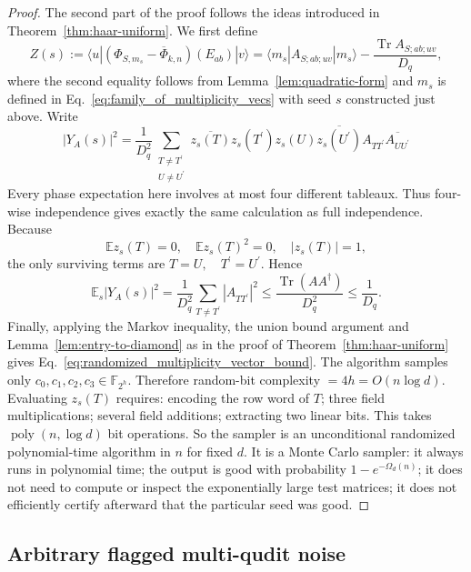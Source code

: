 \documentclass[11pt,letterpaper]{article}
\newcounter{alg}
\theoremstyle{plain}
\theoremstyle{plain}
\theoremstyle{plain}
\theoremstyle{plain}
\theoremstyle{plain}
\theoremstyle{plain}
\theoremstyle{plain}
\theoremstyle{definition}
\theoremstyle{plain}
\begin{document}
\begin{proof}
The second part of the proof follows the ideas introduced in Theorem~\ref{thm:haar-uniform}. We first define
\[
Z(s):=\langle u|\left(\Phi_{S, m_s}-\overline{\Phi}_{k,n}\right)\left(E_{a b}\right)|v\rangle=\langle m_s| A_{S ; a b ; u v}|m_s\rangle-\frac{\operatorname{Tr} A_{S ; a b ; u v}}{D_q},
\]
where the second equality follows from Lemma~\ref{lem:quadratic-form} and $m_s$ is defined in Eq.~\eqref{eq:family_of_multiplicity_vecs} with seed $s$ constructed just above. Write
$$
\left|Y_A(s)\right|^2=\frac{1}{D_q^2} \sum_{\substack{T \neq T^{\prime} \\ U \neq U^{\prime}}} \overline{z_s(T)} z_s\left(T^{\prime}\right) z_s(U) \overline{z_s\left(U^{\prime}\right)} A_{T T^{\prime}} \overline{A_{U U^{\prime}}}
$$
Every phase expectation here involves at most four different tableaux. Thus four-wise independence gives exactly the same calculation as full independence.
Because
$$
\mathbb{E} z_s(T)=0, \quad \mathbb{E} z_s(T)^2=0, \quad\left|z_s(T)\right|=1,
$$
the only surviving terms are
$
T=U, \quad T^{\prime}=U^{\prime} .
$
Hence
$$
\mathbb{E}_s\left|Y_A(s)\right|^2=\frac{1}{D_q^2} \sum_{T \neq T^{\prime}}\left|A_{T T^{\prime}}\right|^2\leq \frac{\operatorname{Tr}\left(A A^{\dagger}\right)}{D_q^2}\leq \frac{1}{D_q}.
$$
Finally, applying the Markov inequality, the union bound argument and Lemma~\ref{lem:entry-to-diamond} as in the proof of Theorem~\ref{thm:haar-uniform} gives Eq.~\ref{eq:randomized_multiplicity_vector_bound}.
The algorithm samples only
$
c_0, c_1, c_2, c_3 \in \mathbb{F}_{2^h} .
$
Therefore random-bit complexity $=4 h=O(n \log d)$.
Evaluating $z_s(T)$ requires:
encoding the row word of $T$;
three field multiplications;
several field additions;
extracting two linear bits.
This takes
$
\operatorname{poly}(n, \log d)
$
bit operations.
So the sampler is an unconditional randomized polynomial-time algorithm in $n$ for fixed $d$.
It is a Monte Carlo sampler:
it always runs in polynomial time;
the output is good with probability $1-e^{-\Omega_d(n)}$;
it does not need to compute or inspect the exponentially large test matrices;
it does not efficiently certify afterward that the particular seed was good.
\end{proof}


\subsection{Arbitrary flagged multi-qudit noise}\label{subsec:supple_arb_3_noise}
\end{document}

